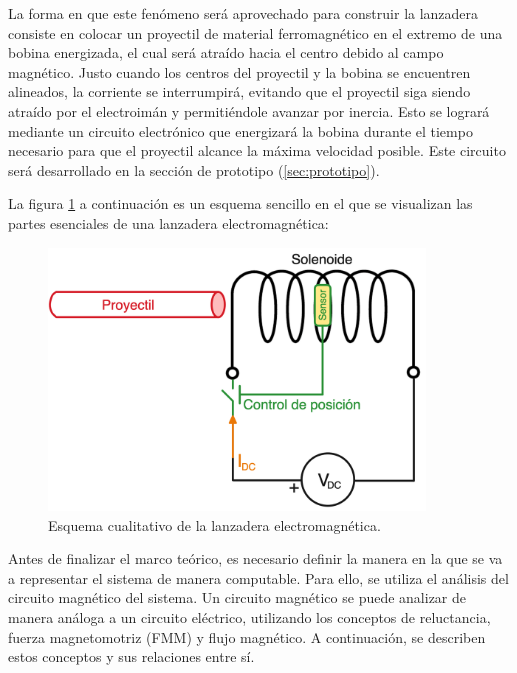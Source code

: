 La forma en que este fenómeno será aprovechado para construir la lanzadera consiste en colocar un proyectil de material ferromagnético en el extremo de una bobina energizada, el cual será atraído hacia el centro debido al campo magnético. Justo cuando los centros del proyectil y la bobina se encuentren alineados, la corriente se interrumpirá, evitando que el proyectil siga siendo atraído por el electroimán y permitiéndole avanzar por inercia. Esto se logrará mediante un circuito electrónico que energizará la bobina durante el tiempo necesario para que el proyectil alcance la máxima velocidad posible. Este circuito será desarrollado en la sección de prototipo (\ref{sec:prototipo}).

La figura \ref{fig:esquemabasico} a continuación es un esquema sencillo en el que se visualizan las partes esenciales de una lanzadera electromagnética:

\begin{figure}[H]
    \centering %
    \includegraphics[width=10cm]{FigurasMemoria/esquemabasico.png}
    \caption{Esquema cualitativo de la lanzadera electromagnética.}
    \label{fig:esquemabasico} %
\end{figure}

\newpage
Antes de finalizar el marco teórico, es necesario definir la manera en la que se va a representar el sistema de manera computable. Para ello, se utiliza el análisis del circuito magnético del sistema. Un circuito magnético se puede analizar de manera análoga a un circuito eléctrico, utilizando los conceptos de reluctancia, fuerza magnetomotriz (FMM) y flujo magnético. A continuación, se describen estos conceptos y sus relaciones entre sí.

